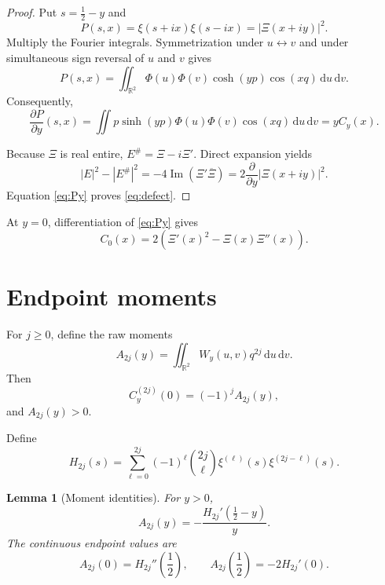 \documentclass[11pt]{amsart}
\newtheorem{lemma}[theorem]{Lemma}
\theoremstyle{remark}
\newcommand{\R}{\mathbb{R}}
\newcommand{\dd}{\,\mathrm{d}}
\begin{document}
\begin{proof}
Put $s=\frac12-y$ and
\[
P(s,x)=\xi(s+ix)\xi(s-ix)=|\Xi(x+iy)|^2.
\]
Multiply the Fourier integrals.  Symmetrization under $u\leftrightarrow v$
and under simultaneous sign reversal of $u$ and $v$ gives
\begin{equation}\label{eq:P-double}
P(s,x)=\iint_{\R^2}
\Phi(u)\Phi(v)\cosh(yp)\cos(xq)\dd u\dd v.
\end{equation}
Consequently,
\begin{equation}\label{eq:Py}
\frac{\partial P}{\partial y}(s,x)
=\iint p\sinh(yp)\Phi(u)\Phi(v)\cos(xq)\dd u\dd v
=yC_y(x).
\end{equation}

Because $\Xi$ is real entire,
$E^{\#}=\Xi-i\Xi'$.  Direct expansion yields
\[
|E|^2-|E^{\#}|^2
=-4\operatorname{Im}(\Xi'\overline{\Xi})
=2\frac{\partial}{\partial y}|\Xi(x+iy)|^2.
\]
Equation \eqref{eq:Py} proves \eqref{eq:defect}.
\end{proof}

At $y=0$, differentiation of \eqref{eq:Py} gives
\begin{equation}\label{eq:C0}
C_0(x)=2\left(\Xi'(x)^2-\Xi(x)\Xi''(x)\right).
\end{equation}

\section{Endpoint moments}

For $j\geq0$, define the raw moments
\begin{equation}\label{eq:A}
A_{2j}(y)=\iint_{\R^2}W_y(u,v)q^{2j}\dd u\dd v.
\end{equation}
Then
\begin{equation}\label{eq:C-derivatives}
C_y^{(2j)}(0)=(-1)^jA_{2j}(y),
\end{equation}
and $A_{2j}(y)>0$.

Define
\begin{equation}\label{eq:H}
H_{2j}(s)=\sum_{\ell=0}^{2j}(-1)^\ell
\binom{2j}{\ell}\xi^{(\ell)}(s)\xi^{(2j-\ell)}(s).
\end{equation}

\begin{lemma}[Moment identities]\label{lem:endpoints}
For $y>0$,
\begin{equation}\label{eq:A-H}
A_{2j}(y)=-\frac{H_{2j}'(\frac12-y)}{y}.
\end{equation}
The continuous endpoint values are
\begin{equation}\label{eq:endpoints}
A_{2j}(0)=H_{2j}''\!\left(\frac12\right),
\qquad
A_{2j}\!\left(\frac12\right)=-2H_{2j}'(0).
\end{equation}
\end{lemma}
\end{document}
